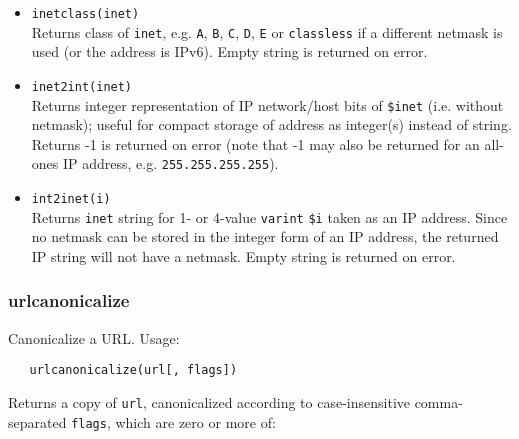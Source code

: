 \begin{itemize}
  \item \verb`inetclass(inet)` \\
    Returns class of \verb`inet`, e.g. {\tt A}, {\tt B}, {\tt C},
    {\tt D}, {\tt E} or {\tt classless} if a different netmask is
    used (or the address is IPv6).  Empty string is returned on error.

  \item \verb`inet2int(inet)` \\

    Returns integer representation of IP network/host bits of
    \verb`$inet` (i.e. without netmask); useful for compact storage of
    address as integer(s) instead of string.
    Returns -1 is returned on error (note that -1 may also be
    returned for an all-ones IP address, e.g. {\tt 255.255.255.255}).

  \item \verb`int2inet(i)` \\
    Returns \verb`inet` string for
    1- or 4-value {\tt varint} \verb`$i`
    taken as an IP address.  Since no netmask can be stored in the
    integer form of an IP address, the returned IP string will not
    have a netmask.  Empty string is returned on error.

\end{itemize}

\subsubsection{urlcanonicalize}

Canonicalize a URL.  Usage:
\begin{verbatim}
   urlcanonicalize(url[, flags])
\end{verbatim}

Returns a copy of \verb`url`, canonicalized according to
case-insensitive comma-separated \verb`flags`, which are zero or more of:

